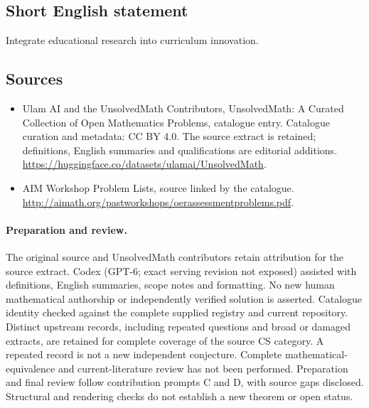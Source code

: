 \documentclass[11pt]{article}
\begin{document}
\subsection{Short English statement}
Integrate educational research into curriculum innovation.
\subsection{Sources}
\begin{itemize}
\item[\hypertarget{source:statement:1}{S1}] Ulam AI and the UnsolvedMath Contributors, UnsolvedMath: A Curated Collection of Open Mathematics Problems, catalogue entry. Catalogue curation and metadata: CC BY 4.0. The source extract is retained; definitions, English summaries and qualifications are editorial additions.
\url{https://huggingface.co/datasets/ulamai/UnsolvedMath}.
\item[\hypertarget{source:statement:2}{S2}] AIM Workshop Problem Lists, source linked by the catalogue.
\url{http://aimath.org/pastworkshops/oerassessmentproblems.pdf}.
\end{itemize}
\paragraph{Preparation and review.}
The original source and UnsolvedMath contributors retain attribution for the source extract. Codex (GPT-6; exact serving revision not exposed) assisted with definitions, English summaries, scope notes and formatting. No new human mathematical authorship or independently verified solution is asserted. Catalogue identity checked against the complete supplied registry and current repository. Distinct upstream records, including repeated questions and broad or damaged extracts, are retained for complete coverage of the source CS category. A repeated record is not a new independent conjecture. Complete mathematical-equivalence and current-literature review has not been performed. Preparation and final review follow contribution prompts C and D, with source gaps disclosed. Structural and rendering checks do not establish a new theorem or open status.
\label{end:statement}
\end{document}

